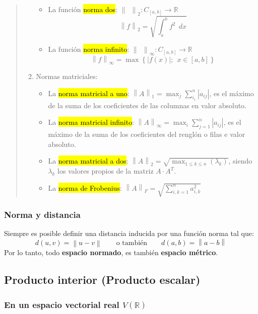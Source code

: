 \begin{quote}
\begin{enumerate}
\begin{itemize}
      \item La función \hl{norma dos}: \(\left\lVert ~~\right\rVert _2 : C_{[a,b]} \rightarrow \mathbb{R}\) \[
        \left\lVert f\right\rVert _2 = \sqrt{\int_{a}^{b}f^2 ~~ dx}
      \]
      \item La función \hl{norma infinito}: \(\left\lVert ~~\right\rVert _\infty : C_{[a,b]} \rightarrow \mathbb{R}\) \[
        \left\lVert f\right\rVert _\infty = \max \left\{\left|f(x)\right|; ~~ x \in [a,b]\right\}
      \]
    \end{itemize}
    \item Normas matriciales:
    \begin{itemize}
      \item La \hl{norma matricial a uno}: \(\left\lVert A\right\rVert _1 = \max _j \sum_{i_1}^{n} \left|a_{ij}\right|\), es el máximo de la suma de los coeficientes de las columnas en valor absoluto.
      \item La \hl{norma matricial infinito}: \(\left\lVert A\right\rVert _\infty = \max _i \sum_{j=1}^{n}\left|a_{ij}\right|\), es el máximo de la suma de los coeficientes del renglón o filas e valor absoluto.
      \item La \hl{norma matricial a dos}: \(\left\lVert A\right\rVert _2 = \sqrt{\max_{1\leq k \leq n}{(\lambda_k)}}\), siendo \(\lambda_k\) los valores propios de la matriz \(A \cdot A^T\). 
      \item La \hl{norma de Frobenius}: \(\left\lVert A\right\rVert _F = \sqrt{\sum_{i,k=1}^{n} a_{i,k}^2}\)
    \end{itemize}
  \end{enumerate}
\end{quote}

\subsubsection{Norma y distancia}

Siempre es posible definir una distancia inducida por una función norma tal que:
\[
  d(u,v) = \left\lVert u-v\right\rVert \qquad \text{o también} \qquad d(a,b) = \left\lVert a-b \right\rVert
\]
Por lo tanto, todo \textbf{espacio normado}, es también \textbf{espacio métrico}.

\subsection{Producto interior (Producto escalar)}

\subsubsection{En un espacio vectorial real \(V(\mathbb{R})\)}

